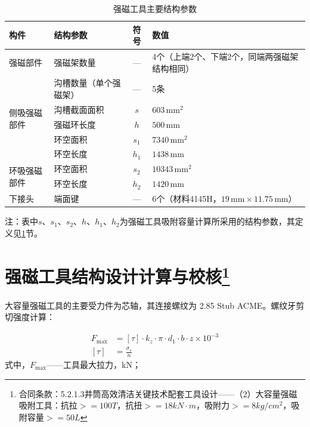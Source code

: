 \begin{table}[htbp]
    \centering
    \caption{强磁工具主要结构参数}
    \label{tab:mag_tool_structure_params}
    \renewcommand{\arraystretch}{1.3} %
    \begin{tabularx}{.9\textwidth}{llcX}
        \toprule
        构件 & 结构参数 & 符号 & 数值 \\
        \midrule
        强磁部件 & 强磁架数量 & --- & 4个（上端2个、下端2个，同端两强磁架结构相同） \\
        \midrule
        \multirow{5}{*}{侧吸强磁部件} & 沟槽数量（单个强磁架） & --- & 5条 \\
         & 沟槽截面面积 & $s$ & $603\,\text{mm}^2$ \\
         & 强磁环长度 & $h$ & $500\,\text{mm}$ \\
         & 环空面积 & $s_1$ & $7340\,\text{mm}^2$ \\
         & 环空长度 & $h_1$ & $1438\,\text{mm}$ \\
        \midrule
        \multirow{2}{*}{环吸强磁部件} & 环空面积 & $s_2$ & $10343\,\text{mm}^2$ \\
         & 环空长度 & $h_2$ & $1420\,\text{mm}$ \\
        \midrule
        下接头 & 端面键 & --- & 6个（材料4145H，$19\,\text{mm}\times11.75\,\text{mm}$） \\
        \bottomrule
    \end{tabularx}
\end{table}

注：表中$s$、$s_1$、$s_2$、$h$、$h_1$、$h_2$为强磁工具吸附容量计算所采用的结构参数，其定义见\ref{sec:mag_tool_check}节。

\section[强磁工具结构设计计算与校核]{强磁工具结构设计计算与校核\protect\footnote{合同条款：5.2.1.3井筒高效清洁关键技术配套工具设计——（2）大容量强磁吸附工具：抗拉$>=100T$，抗扭$>=18kN\cdot m$，吸附力$>=8kg/cm^2$，吸附容量$>=50L$}}\label{sec:mag_tool_check}


大容量强磁工具的主要受力件为芯轴，其连接螺纹为 2.85 Stub ACME。螺纹牙剪切强度计算：

\begin{align}
    F_{\max} &= [\tau] \cdot k_z \cdot \pi \cdot d_1 \cdot b \cdot z \times 10^{-3} \\
    [\tau] &= \frac{\sigma_s}{n}
\end{align}
式中，$F_{\max}$——工具最大拉力，kN；

